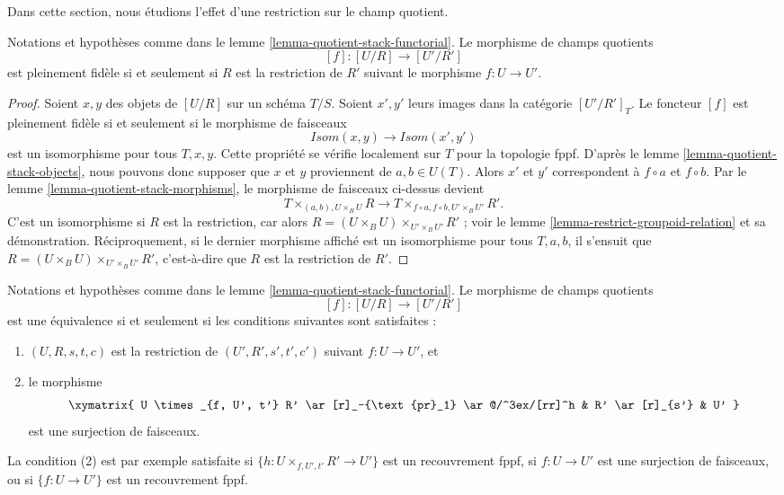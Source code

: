 \noindent
Dans cette section, nous étudions l'effet d'une restriction sur le champ quotient.

\begin{lemma}
\label{lemma-quotient-stack-restrict}
Notations et hypothèses comme dans le lemme \ref{lemma-quotient-stack-functorial}. Le morphisme de champs quotients
$$
[f] : [U/R] \longrightarrow [U'/R']
$$
est pleinement fidèle si et seulement si $R$ est la restriction de $R'$ suivant le morphisme $f : U \to U'$.
\end{lemma}

\begin{proof}
Soient $x, y$ des objets de $[U/R]$ sur un schéma $T/S$. Soient $x', y'$ leurs images dans la catégorie $[U'/R']_T$. Le foncteur $[f]$ est pleinement fidèle si et seulement si le morphisme de faisceaux
$$
\mathit{Isom}(x, y) \longrightarrow \mathit{Isom}(x', y')
$$
est un isomorphisme pour tous $T, x, y$. Cette propriété se vérifie localement sur $T$ pour la topologie fppf. D'après le lemme \ref{lemma-quotient-stack-objects}, nous pouvons donc supposer que $x$ et $y$ proviennent de $a, b \in U(T)$. Alors $x'$ et $y'$ correspondent à $f \circ a$ et $f \circ b$. Par le lemme \ref{lemma-quotient-stack-morphisms}, le morphisme de faisceaux ci-dessus devient
$$
T \times_{(a, b), U \times_B U} R
\longrightarrow
T \times_{f \circ a, f \circ b, U' \times_B U'} R'.
$$
C'est un isomorphisme si $R$ est la restriction, car alors $R = (U \times_B U) \times_{U' \times_B U'} R'$ ; voir le lemme \ref{lemma-restrict-groupoid-relation} et sa démonstration. Réciproquement, si le dernier morphisme affiché est un isomorphisme pour tous $T, a, b$, il s'ensuit que $R = (U \times_B U) \times_{U' \times_B U'} R'$, c'est-à-dire que $R$ est la restriction de $R'$.
\end{proof}

\begin{lemma}
\label{lemma-quotient-stack-restrict-equivalence}
Notations et hypothèses comme dans le lemme
\ref{lemma-quotient-stack-functorial}. Le morphisme de champs quotients
$$
[f] : [U/R] \longrightarrow [U'/R']
$$
est une équivalence si et seulement si les conditions suivantes sont satisfaites :
\begin{enumerate}
\item $(U, R, s, t, c)$ est la restriction de $(U', R', s', t', c')$
suivant $f : U \to U'$, et
\item le morphisme
$$
\xymatrix{
U \times_{f, U', t'} R' \ar[r]_-{\text{pr}_1} \ar@/^3ex/[rr]^h
& R' \ar[r]_{s'} & U'
}
$$
est une surjection de faisceaux.
\end{enumerate}
La condition (2) est par exemple satisfaite si
$\{h : U \times_{f, U', t'} R' \to U'\}$ est un recouvrement fppf,
si $f : U \to U'$ est une surjection de faisceaux, ou si
$\{f : U \to U'\}$ est un recouvrement fppf.
\end{lemma}

